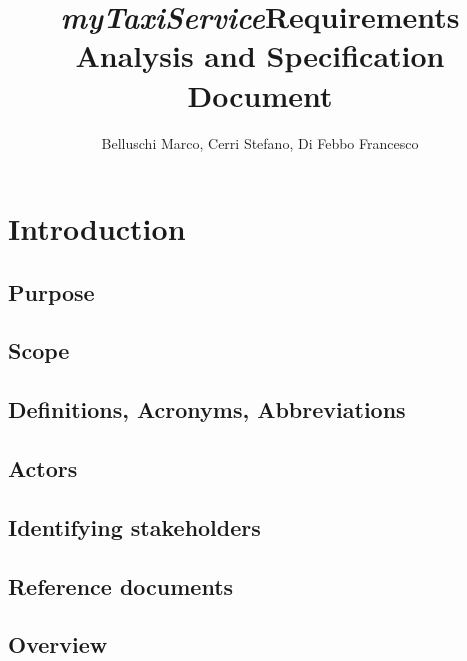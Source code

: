 \documentclass[]{report}
\title{{\Huge \emph{myTaxiService}}\linebreak Requirements Analysis and Specification Document}
\author{Belluschi Marco, Cerri Stefano, Di Febbo Francesco}
\begin{document}
\maketitle
\tableofcontents

\chapter{Introduction}

\section{Purpose}


\section{Scope}


%

\section{Definitions, Acronyms, Abbreviations}


\section{Actors}


\section{Identifying stakeholders}


\section{Reference documents}


\section{Overview}



\end{document}
